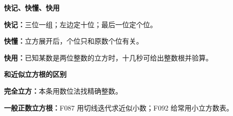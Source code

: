 \clearpage
\begin{summarybox}
\textbf{\textcolor{CSummary}{快记、快懂、快用}}
\par\medskip
\begin{center}

\end{center}
\medskip
\textbf{快记：}三位一组；左边定十位；最后一位定个位。\par\textbf{快懂：}立方展开后，个位只和原数个位有关。\par\textbf{快用：}已知某数是两位整数的立方时，十几秒可给出整数根并验算。
\end{summarybox}
\clearpage
\begin{summarybox}
\textbf{\textcolor{CSummary}{和近似立方根的区别}}
\par\medskip
\begin{center}

\end{center}
\medskip
\textbf{完全立方：}本条用数位法找精确整数。\par\textbf{一般正数立方根：}F087 用切线迭代求近似小数；F092 给常用小立方数表。
\end{summarybox}
